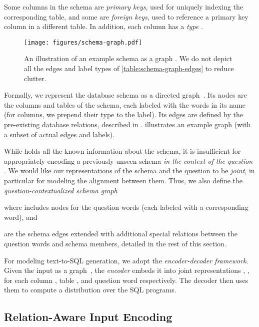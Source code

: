\documentclass[11pt,a4paper,final]{article}
\begin{document}
Some columns in the schema are \emph{primary keys}, used for uniquely indexing the corresponding table,
and some are \emph{foreign keys}, used to reference a primary key column in a different table.
In addition, each column has a \emph{type} .



\begin{figure}[t]
    \centering
    \texttt{[image: figures/schema-graph.pdf]}
    \vspace{-1\baselineskip}
    \caption{An illustration of an example schema as a graph . We do not depict all the edges and label types
        of \cref{table:schema-graph-edges} to reduce clutter.}
    \vspace{-1\baselineskip}
    \label{fig:schema-graph}
\end{figure}

Formally, we represent the database schema as a directed
graph~.
Its nodes  are the columns and tables of the schema, each labeled with the
words in its name (for columns, we prepend their type  to the label).
Its edges  are defined by the pre-existing database relations, described in
.
 illustrates an example graph (with a subset of actual edges and labels).

While  holds all the known information about the schema, it is insufficient for appropriately encoding a
previously unseen schema \emph{in the context of the question }.
We would like our representations of the schema  and the question  to be \emph{joint}, in particular
for modeling the alignment between them.
Thus, we also define the \emph{question-contextualized schema graph}

where  includes
nodes for the question words (each labeled with a corresponding word), and

are the schema edges  extended with additional special relations between the question words and schema
members, detailed in the rest of this section.

For modeling text-to-SQL generation, we adopt the \emph{encoder-decoder framework}.
Given the input as a graph~, the \emph{encoder}  embeds it into joint representations
, ,  for each column , table , and question word  respectively.
The decoder  then uses them to compute a distribution  over
the SQL programs.



\subsection{Relation-Aware Input Encoding}
\label{sec:rel-attn}
\end{document}
